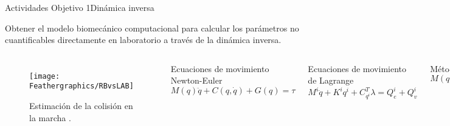 \documentclass[10pt]{beamer}
\begin{document}
\begin{frame}{Actividades Objetivo 1}{Dinámica inversa}

\begin{block}{\small{Obtener el modelo biomecánico computacional para calcular los parámetros no cuantificables directamente en laboratorio a través de la dinámica inversa.}}
\end{block}
\begin{columns}[t]
\column{60 mm}
\begin{figure}
\begin{centering}
\texttt{[image: Feathergraphics/RBvsLAB]}
\par\end{centering}
\caption{\scriptsize {\scriptsize {Estimación de la colisión en la marcha \cite{Zelik2010}.}}}
\end{figure}
\column{60 mm}
\begin{block}{\scriptsize {Ecuaciones de movimiento Newton-Euler}}
\begin{equation}
M(q)\ddot{q}+C(q,\dot{q})+G(q)=\tau
\end{equation}
\end{block}
\begin{block}{\scriptsize {Ecuaciones de movimiento de Lagrange}}
\begin{equation}
M^{i}\ddot{q}+K^{i}q^{i}+C_{q^{i}}^{T}\lambda=Q_{e}^{i}+Q_{v}^{i}
\end{equation}
\end{block}
\begin{block}{\scriptsize {Método de Kane}}
\begin{equation}
M(q,t)\dot{u}=f(q,\dot{q},u,t)
\end{equation}
\end{block}
\end{columns}
\end{frame}
\end{document}
